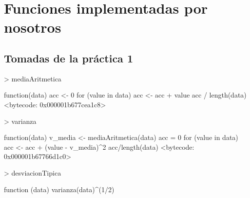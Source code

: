 \documentclass [a4paper] {article}
\begin{document}
\newpage
\section{Funciones implementadas por nosotros}
\subsection{Tomadas de la práctica 1}
\begin{Schunk}
\begin{Sinput}
> mediaAritmetica
\end{Sinput}
\begin{Soutput}
function(data){
  acc <- 0
  for (value in data) {
    acc <- acc + value
  }
  acc / length(data)
}
<bytecode: 0x000001b677cea1c8>
\end{Soutput}
\begin{Sinput}
> varianza
\end{Sinput}
\begin{Soutput}
function(data) {
  v_media <- mediaAritmetica(data)
  acc = 0
  for (value in data){
    acc <- acc + (value - v_media)^2
  }
  acc/length(data)
}
<bytecode: 0x000001b67766d1c0>
\end{Soutput}
\begin{Sinput}
> desviacionTipica
\end{Sinput}
\begin{Soutput}
function (data) {
  varianza(data)^(1/2)
}
\end{Soutput}
\end{Schunk}
\end{document}
